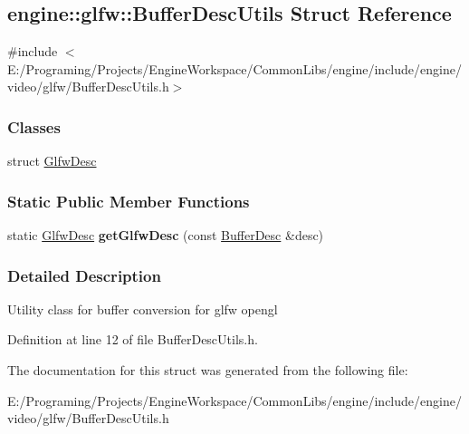 \hypertarget{a00008}{}\subsection{engine\+:\+:glfw\+:\+:Buffer\+Desc\+Utils Struct Reference}
\label{a00008}


{\ttfamily \#include $<$E\+:/\+Programing/\+Projects/\+Engine\+Workspace/\+Common\+Libs/engine/include/engine/video/glfw/\+Buffer\+Desc\+Utils.\+h$>$}

\subsubsection*{Classes}
\begin{DoxyCompactItemize}
\item 
struct \hyperlink{a00042}{Glfw\+Desc}
\end{DoxyCompactItemize}
\subsubsection*{Static Public Member Functions}
\begin{DoxyCompactItemize}
\item 
static \hyperlink{a00042}{Glfw\+Desc} {\bfseries get\+Glfw\+Desc} (const \hyperlink{a00007}{Buffer\+Desc} \&desc)\hypertarget{a00008_ae66e0e9ef85d4cf18de73e6652897733}{}\label{a00008_ae66e0e9ef85d4cf18de73e6652897733}

\end{DoxyCompactItemize}


\subsubsection{Detailed Description}
Utility class for buffer conversion for glfw opengl 

Definition at line 12 of file Buffer\+Desc\+Utils.\+h.



The documentation for this struct was generated from the following file\+:\begin{DoxyCompactItemize}
\item 
E\+:/\+Programing/\+Projects/\+Engine\+Workspace/\+Common\+Libs/engine/include/engine/video/glfw/Buffer\+Desc\+Utils.\+h\end{DoxyCompactItemize}
